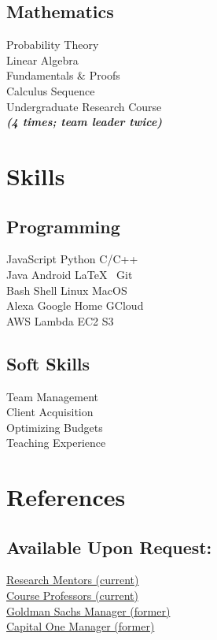 \documentclass[]{deedy-resume-openfont}
\begin{document}
\begin{minipage}[t]{0.33\textwidth}
\subsection{Mathematics}
Probability Theory \\
Linear Algebra \\
Fundamentals \& Proofs \\
Calculus Sequence \\
Undergraduate Research Course \\
{\footnotesize \textit{\textbf{(4 times; team leader twice) }}} \\
\sectionsep


\section{Skills}
\subsection{Programming}
JavaScript \textbullet{} Python \textbullet{} C/C++ \\
Java \textbullet{} Android \textbullet{} \LaTeX\ \textbullet{} Git \\
Bash Shell \textbullet{} Linux \textbullet{} MacOS \\
Alexa \textbullet{} Google Home \textbullet{} GCloud \\
AWS \textbullet{} Lambda \textbullet{} EC2 \textbullet{} S3 \\
\sectionsep

\subsection{Soft Skills}
Team Management \\
Client Acquisition \\
Optimizing Budgets \\
Teaching Experience
\sectionsep


\section{References}
\subsection{Available Upon Request:}

\href{mailto:r-sowers@illinois.edu}{Research Mentors (current)} \\
\href{mailto:challen@illinois.edu}{Course Professors (current)} \\
\href{mailto:shivam.x.sinha@ny.email.gs.com}{Goldman Sachs Manager (former)} \\
\href{mailto:patrick.mackay@capitalone.com}{Capital One Manager (former)} \\


\end{minipage}
\end{document}
